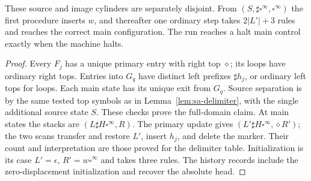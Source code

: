 \begin{lemma}\label{lem:sa-prefix-insertion}
These source and image cylinders are separately disjoint.  From
$(S,\sharp\square^\infty,\square^\infty)$ the first procedure inserts
$w$, and thereafter one ordinary step takes $2|L'|+3$ rules and reaches
the correct main configuration.  The run reaches a halt main control
exactly when the machine halts.
\end{lemma}
\begin{proof}
Every $F_j$ has a unique primary entry with right top $\diamond$;
its loops have ordinary right tops.  Entries into $G_q$ have distinct
left prefixes $\sharp h_j$, or ordinary left tops for loops.  Each
main state has its unique exit from $G_q$.  Source separation is by the
same tested top symbols as in Lemma~\ref{lem:sa-delimiter}, with the
single additional source state $S$.  These checks prove the full-domain
claim.  At main states the stacks are $(L\sharp H\square^\infty,R)$.
The primary update gives $(L'\sharp H\square^\infty,\diamond R')$;
the two scans transfer and restore $L'$, insert $h_j$, and delete the
marker.  Their count and interpretation are those proved for the
delimiter table.  Initialization is its case $L'=\epsilon$,
$R'=w\square^\infty$ and takes three rules.  The history records include
the zero-displacement initialization and recover the absolute head.
\end{proof}

